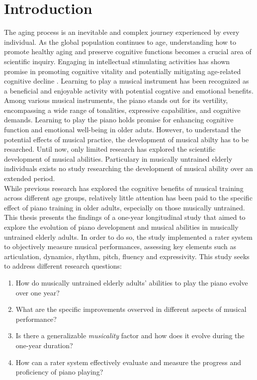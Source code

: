 \chapter{Introduction}

The aging process is an inevitable and complex journey experienced by every individual. As the global population continues to age, understanding how to promote healthy aging and preserve cognitive functions becomes a crucial area of scientific inquiry. Engaging in intellectual stimulating activities has shown promise in promoting cognitive vitality and potentially mitigating age-related cognitive decline \cite{Verghese2003}. Learning to play a musical instrument has been recognized as a beneficial and enjoyable activity with potential cogntive and emotional benefits. Among various musical instruments, the piano stands out for its vertility, encompassing a wide range of tonalities, expressive capabilities, and cognitive demands. Learning to play the piano holds promise for enhancing cognitive function and emotional well-being in older aduts. However, to understand the potential effects of musical practice, the development of musical abilty has to be resarched. Until now, only limited research has explored the scientific development of musical abilities. Particulary in musically untrained elderly individuals exists no study researching the development of musical ability over an extended period.\\
While previous research has explored the cognitive benefits of musical training across different age groups, relatively little attention has been paid to the specific effect of piano training in older adults, especially on those musically untrained. This thesis presents the findings of a one-year longitudinal study that aimed to explore the evolution of piano development and musical abilities in musically untrained elderly adults. In order to do so, the study implemented a rater system to objectively measure musical performances, assessing key elements such as articulation, dynamics, rhythm, pitch, fluency and expressivity. 
This study seeks to address different research questions: 
\begin{enumerate}
\item How do musically untrained elderly adults' abilities to play the piano evolve over one year?
\item What are the specific improvements ovserved in different aspects of musical performance?
\item Is there a generalizable \textit{musicality} factor and how does it evolve during the one-year duration?
\item How can a rater system effectively evaluate and measure the progress and proficiency of piano playing?
\end{enumerate}

